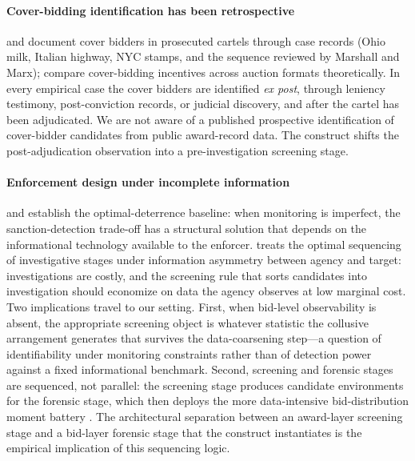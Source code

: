 \paragraph{Cover-bidding identification has been retrospective}
\citet{porter1999ohio,pesendorfer2000study,asker2010leniency}
and \citet{marshall2012economics} document cover bidders in
prosecuted cartels through case records (Ohio milk, Italian
highway, NYC stamps, and the sequence reviewed by Marshall and
Marx); \citet{athey2011comparing} compare cover-bidding
incentives across auction formats theoretically. In every
empirical case the cover bidders are identified \emph{ex post},
through leniency testimony, post-conviction records, or judicial
discovery, and after the cartel has been adjudicated. We are not
aware of a published prospective identification of cover-bidder
candidates from public award-record data. The construct shifts
the post-adjudication observation into a pre-investigation
screening stage.

\paragraph{Enforcement design under incomplete information}
\citet{becker1968crime} and \citet{stigler1970optimum} establish
the optimal-deterrence baseline: when monitoring is imperfect,
the sanction-detection trade-off has a structural solution that
depends on the informational technology available to the
enforcer. \citet{baker2002case} treats the optimal sequencing of
investigative stages under information asymmetry between agency
and target: investigations are costly, and the screening rule
that sorts candidates into investigation should economize on
data the agency observes at low marginal cost. Two implications
travel to our setting. First, when bid-level observability is
absent, the appropriate screening object is whatever statistic
the collusive arrangement generates that survives the
data-coarsening step---a question of identifiability under
monitoring constraints rather than of detection power against a
fixed informational benchmark. Second, screening and forensic
stages are sequenced, not parallel: the screening stage produces
candidate environments for the forensic stage, which then
deploys the more data-intensive bid-distribution moment battery
\citep{chassang2022robust,harrington2008detecting}. The
architectural separation between an award-layer screening stage
and a bid-layer forensic stage that the construct instantiates
is the empirical implication of this sequencing logic.

